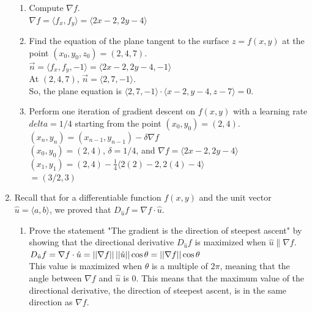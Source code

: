 \begin{enumerate}
\begin{enumerate}[label=\alph*.]
		\item Compute $\nabla f$.\\
		\indent
		$\nabla f = \langle f_x, f_y\rangle = \langle 2x-2, 2y-4 \rangle$\\
		
		\item Find the equation of the plane tangent to the surface $z = f(x,y)$ at the point $(x_0, y_0, z_0) = (2,4,7)$.\\
		\indent
		$\vec{n} = \langle f_x, f_y, -1\rangle = \langle 2x-2, 2y-4, -1 \rangle$\\
		At $(2,4,7)$, $\vec{n} = \langle 2, 7, -1 \rangle$.\\
		So, the plane equation is $\langle 2, 7, -1 \rangle \cdot \langle x-2, y-4, z-7 \rangle = 0$.\\
		
		\item Perform one iteration of gradient descent on $f(x,y)$ with a learning rate $delta = 1/4$ starting from the point $(x_0,y_0) = (2,4)$.\\
		\indent
		$(x_n, y_n) = (x_{n-1},y_{n-1}) - \delta\nabla f$\\
		$(x_0, y_0) = (2,4)$, $\delta = 1/4$, and $\nabla f = \langle 2x-2, 2y-4 \rangle$\\
		$(x_1, y_1) = (2,4) - \frac{1}{4} \langle 2(2)-2, 2(4)-4 \rangle$\\
		$= (3/2, 3)$\\
	\end{enumerate}

	\item Recall that for a differentiable function $f(x,y)$ and the unit vector $\hat{u} = \langle a, b \rangle$, we proved that $D_{\hat{u}}f = \nabla f \cdot \hat{u}$.
	\begin{enumerate}[label=\alph*.]
		\item Prove the statement "The gradient is the direction of steepest ascent" by showing that the directional derivative $D_{\hat{u}}f$ is maximized when $\hat{u}\parallel\nabla f$.\\
		\indent
		$D_{\hat{u}}f = \nabla f \cdot \hat{u}=\left|\left|\nabla f\right|\right|\left|\left|\hat{u}\right|\right|\cos{\theta} = \left|\left|\nabla f\right|\right|\cos{\theta}$\\
		This value is maximized when $\theta$ is a multiple of $2\pi$, meaning that the angle between $\nabla f$ and $\hat{u}$ is 0. This means that the maximum value of the directional derivative, the direction of steepest ascent, is in the same direction as $\nabla f$.\\
			

\end{enumerate}
\end{enumerate}
